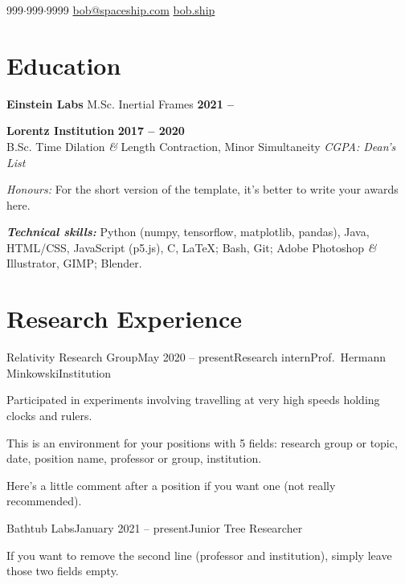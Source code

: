 \documentclass{resume}
\begin{document}
\begin{center}
    \contact
        {999$\cdot$999$\cdot$9999}
        {\href{mailto://bob@spaceship.com}{bob@spaceship.com}}
        {\href{https://bob.ship}{bob.ship}}
\end{center}

\section{Education} 
\begin{content}
    {\bf Einstein Labs} {M.Sc. Inertial Frames} \hfill {\bf 2021 --} 

    {\bf Lorentz Institution} \hfill {\bf 2017 -- 2020} \\ 
    {B.Sc. Time Dilation {\em\&} Length Contraction, Minor Simultaneity} \hfill 
    {\em CGPA:  \quad Dean's List}
    
    \vspace{-.25\baselineskip}
    
    {\em Honours:} For the short version of the template, it's better to write your awards here.
    
    {\bf \em Technical skills:} Python {\footnotesize (numpy, tensorflow, matplotlib, pandas)}, Java, HTML/CSS, JavaScript (p5.js), C, \LaTeX; Bash, Git; Adobe Photoshop {\em \&} Illustrator, GIMP; Blender.
\sectionlineskip
\end{content}

\section{Research Experience}
\begin{content}

    \begin{position}{Relativity Research Group}{May 2020 -- present}{Research intern}{Prof.~Hermann Minkowski}{Institution}
    \item Participated in experiments involving travelling at very high speeds holding clocks and rulers.
    \item This is an environment for your positions with 5 fields: research group or topic, date, position name, professor or group, institution. 
    \end{position}
    \vspace{-.5\baselineskip}
    Here's a little comment after a position if you want one (not really recommended).

    \begin{position}{Bathtub Labs}{January 2021 -- present}{Junior Tree Researcher}{}{}
    \item If you want to remove the second line (professor and institution), simply leave those two fields empty. 
    \end{position}

\sectionlineskip
\end{content}
\end{document}
